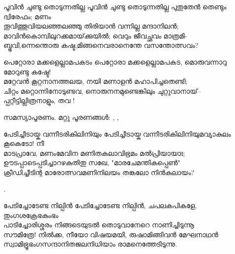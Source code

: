 \begin{enumerate}

\begin{slokam}{\VSv}{\KND}{പൂവിൻ ചുണ്ടു തൊടുന്നതില്ല}
പൂവിൻ ചുണ്ടു തൊടുന്നതില്ല പുതുതേൻ തെണ്ടും ദ്വിരേഫം; മണം\\
തൂവിത്തൂവിയലഞ്ഞലഞ്ഞു തിരിയാൻ വന്നില്ല മന്ദാനിലൻ;\\
മാവിൻകൊമ്പിലുറക്കമായ്‌ക്കുയിൽ; വെറും ജീവച്ഛവം മാത്രമി-\\
ബ്ഭൂവി,ന്നെന്തൊരു കഷ്ട,മിങ്ങനെവരാനെന്തേ വസന്തോത്സവം?
\end{slokam}



\begin{slokam}{\VSr}{\Unk}{പെറ്റോരാ മക്കളെല്ലാമപകടം}
പെറ്റോരാ മക്കളെല്ലാമപകട, മൊരുവന്നാറു മോറുണ്ടു കഷ്ടേ!\\
മറ്റേവന്‍ കൂറ്റനാനത്തലയ, നയി മണാളന്‍ മഹാപിച്ചതെണ്ടി;\\
ചിറ്റം മറ്റൊന്നിനോടുണ്ടവ, നൊരുനനമുണ്ടെങ്കിലും ചുറ്റുവാനായ്‌–\\
പ്പറ്റീട്ടില്ലിത്രനാളും, തവ !
\end{slokam}



സമസ്യാപൂരണം. മറ്റു പൂരണങ്ങൾ: , , 


\begin{slokam}{\VSr}{\Unk}{പേടിച്ചീടായ്ക വന്നീടരികിലിനിയും}
പേടിച്ചീടായ്ക വന്നീടരികിലിനിയുമവ്യാകുലം കൂകെടോ! നീ\\
മാടപ്രാവേ, മണംമേവിന മണിതകലാവിഭ്രമം മൽപ്രിയായാഃ;\\
ഊടപ്പാടെപ്പടിച്ചാറഴകുതിതു സഖേ, "മാരചേമന്തികപ്പെൺ"\\
ക്രീഡിച്ചീടിന്റ മാരോത്സവമണിനിലയം തങ്കലോ നിൻകുലായം?
\end{slokam}


.


\begin{slokam}{\VSr}{\ARRV}{പേടിച്ചോടേണ്ട നില്പിൻ}
പേടിച്ചോടേണ്ട നില്പിൻ, ചപലകപികളേ, തുംഗശക്രേഭകുംഭം\\
പാടിച്ചോരിശ്ശരം നിങ്ങടെയുടൽ തൊടുവാനേറെ നാണിച്ചിടുന്നൂ\\
സൗമിത്രേ! നിൽക്ക, നീയോ വിഷയമയി, രുഷാമിങ്ങിവൻ മേഘനാഥൻ\\
സ്വാമിഭ്രൂഭംഗസന്ദാനിതജലനിധിയാം രാമനെത്തേടിടുന്നു. 
\end{slokam}



\end{enumerate}
